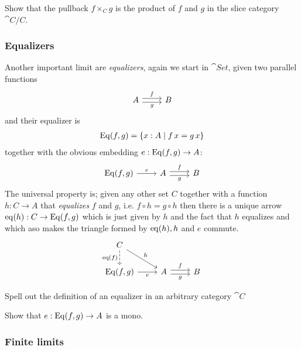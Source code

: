 \begin{Exercise}
  Show that the pullback $f \times_C g$ is the product of $f$ and $g$ in the slice category $\cat{C}/C$.
\end{Exercise}

\subsubsection*{Equalizers}
\label{sec:equalizers}

Another important limit are \emph{equalizers}, again we start in $\cat{Set}$, given two parallel functions
\[\begin{tikzcd}
  A \arrow[r,"f",shift left] \arrow[r,"g" below,shift right]& B 
\end{tikzcd}\]
and their equalizer is 
\begin{align*}
\mathrm{Eq}(f,g)  = \{ x : A \mid f\,x = g\,x \}
\end{align*}
together with the obvious embedding $e : \mathrm{Eq}(f,g) \to A$:
\[\begin{tikzcd}
  \Eq{f}{g} \arrow[r,"e"] & A \arrow[r,"f",shift left] \arrow[r,"g" below,shift right]& B 
\end{tikzcd}\]
The universal property is; given any other set $C$ together with a function $h : C \to A$ that \emph{equalizes} $f$ and $g$, i.e. $f \circ h = g \circ h$ then there is a unique arrow $\mathrm{eq}(h) : C \to \mathrm{Eq}(f,g)$ which is just given by $h$ and the fact that $h$ equalizes and which aso makes the triangle formed by $\mathrm{eq}(h),h$ and $e$ commute.
\[\begin{tikzcd}
    C \arrow[dr,"h"] \arrow[d, dashrightarrow,"\eq{f}" left] \\
  \Eq{f}{g} \arrow[r,"e" below] & A \arrow[r,"f",shift left] \arrow[r,"g" below,shift right]& B 
\end{tikzcd}\]

\begin{Exercise}
  Spell out the definition of an equalizer in an arbitrary category $\cat{C}$
\end{Exercise}

\begin{Exercise}
  Show that  $e : \mathrm{Eq}(f,g) \to A$ is a mono.
\end{Exercise}

\subsubsection*{Finite limits}
\label{sec:finite-limits}

